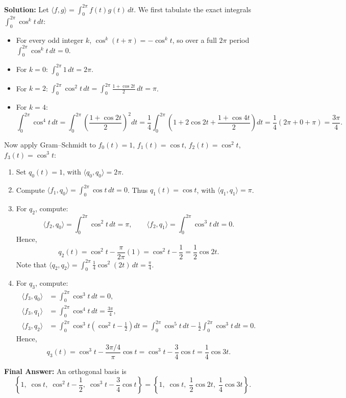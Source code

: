 \documentclass[11pt, letterpaper]{article}
\theoremstyle{definition}
\theoremstyle{remark}
\begin{document}
\textbf{Solution:}
Let $\langle f, g \rangle = \int_0^{2\pi} f(t)g(t)\,dt$. We first tabulate the exact integrals $\int_0^{2\pi} \cos^k t\,dt$:
\begin{itemize}
    \item For every odd integer $k$, $\cos^k(t + \pi) = -\cos^k t$, so over a full $2\pi$ period $\int_0^{2\pi} \cos^k t\,dt = 0$.
    \item For $k = 0$: $\int_0^{2\pi} 1\,dt = 2\pi$.
    \item For $k = 2$: $\int_0^{2\pi} \cos^2 t\,dt = \int_0^{2\pi} \frac{1 + \cos 2t}{2}\,dt = \pi$.
    \item For $k = 4$:
    \[
        \int_0^{2\pi} \cos^4 t\,dt = \int_0^{2\pi} \left(\frac{1 + \cos 2t}{2}\right)^2 dt = \frac{1}{4}\int_0^{2\pi} \left(1 + 2\cos 2t + \frac{1 + \cos 4t}{2}\right) dt = \frac{1}{4}\left(2\pi + 0 + \pi\right) = \frac{3\pi}{4}.
    \]
\end{itemize}
Now apply Gram--Schmidt to $f_0(t) = 1$, $f_1(t) = \cos t$, $f_2(t) = \cos^2 t$, $f_3(t) = \cos^3 t$:
\begin{enumerate}
    \item Set $q_0(t) = 1$, with $\langle q_0, q_0 \rangle = 2\pi$.
    \item Compute $\langle f_1, q_0 \rangle = \int_0^{2\pi} \cos t\,dt = 0$. Thus $q_1(t) = \cos t$, with $\langle q_1, q_1 \rangle = \pi$.
    \item For $q_2$, compute:
    \[
        \langle f_2, q_0 \rangle = \int_0^{2\pi} \cos^2 t\,dt = \pi, \qquad \langle f_2, q_1 \rangle = \int_0^{2\pi} \cos^3 t\,dt = 0.
    \]
    Hence,
    \[
        q_2(t) = \cos^2 t - \frac{\pi}{2\pi}(1) = \cos^2 t - \frac{1}{2} = \frac{1}{2}\cos 2t.
    \]
    Note that $\langle q_2, q_2 \rangle = \int_0^{2\pi} \frac{1}{4}\cos^2(2t)\,dt = \frac{\pi}{4}$.
    \item For $q_3$, compute:
    \begin{align*}
        \langle f_3, q_0 \rangle &= \int_0^{2\pi} \cos^3 t\,dt = 0, \\
        \langle f_3, q_1 \rangle &= \int_0^{2\pi} \cos^4 t\,dt = \frac{3\pi}{4}, \\
        \langle f_3, q_2 \rangle &= \int_0^{2\pi} \cos^3 t \left(\cos^2 t - \frac{1}{2}\right) dt = \int_0^{2\pi} \cos^5 t\,dt - \frac{1}{2}\int_0^{2\pi} \cos^3 t\,dt = 0.
    \end{align*}
    Hence,
    \[
        q_3(t) = \cos^3 t - \frac{3\pi/4}{\pi}\cos t = \cos^3 t - \frac{3}{4}\cos t = \frac{1}{4}\cos 3t.
    \]
\end{enumerate}
\textbf{Final Answer:} An orthogonal basis is
\[
    \left\{1,\; \cos t,\; \cos^2 t - \frac{1}{2},\; \cos^3 t - \frac{3}{4}\cos t\right\} = \left\{1,\; \cos t,\; \frac{1}{2}\cos 2t,\; \frac{1}{4}\cos 3t\right\}.
\]
\end{document}
